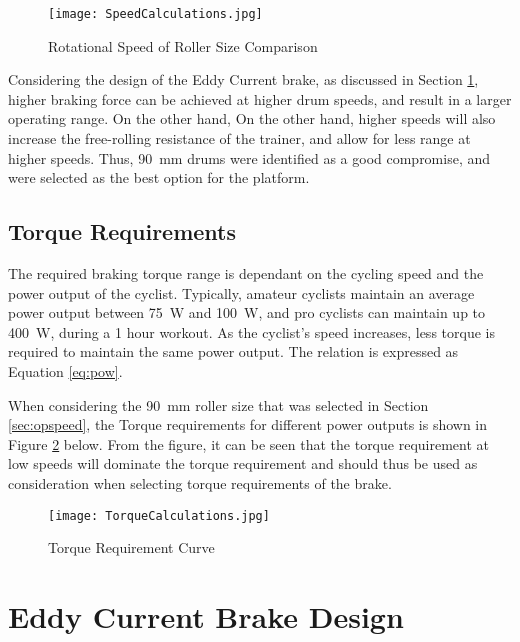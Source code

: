 \begin{figure}[H]
	\begin{center}
		\texttt{[image: SpeedCalculations.jpg]}
		\caption{Rotational Speed of Roller Size Comparison}
		\label{fig:speedCalc}
	\end{center}
\end{figure}

Considering the design of the Eddy Current brake, as discussed in Section \ref{sec:Eddy}, higher braking force can be achieved at higher drum speeds, and result in a larger operating range. On the other hand,  On the other hand, higher speeds will also increase the free-rolling resistance of the trainer, and allow for less range at higher speeds. Thus, \SI{90}{\milli\meter} drums were identified as a good compromise, and were selected as the best option for the platform.\\

\subsection{Torque Requirements}

The required braking torque range is dependant on the cycling speed and the power output of the cyclist. Typically, amateur cyclists maintain an average power output between \SI{75}{\watt} and \SI{100}{\watt}, and pro cyclists can maintain up to \SI{400}{\watt}, during a 1 hour workout. As the cyclist's speed increases, less torque is required to maintain the same power output. The relation is expressed as Equation \ref{eq:pow}.

When considering the \SI{90}{\milli\meter} roller size that was selected in Section \ref{sec:opspeed}, the Torque requirements for different power outputs is shown in Figure \ref{fig:torqueCalc} below. From the figure, it can be seen that the torque requirement at low speeds will dominate the torque requirement and should thus be used as consideration when selecting torque requirements of the brake.

\begin{figure}[H]
	\begin{center}
		\texttt{[image: TorqueCalculations.jpg]}
		\caption{Torque Requirement Curve}
		\label{fig:torqueCalc}
	\end{center}
\end{figure}

\newpage

\section{Eddy Current Brake Design}
\label{sec:Eddy}

